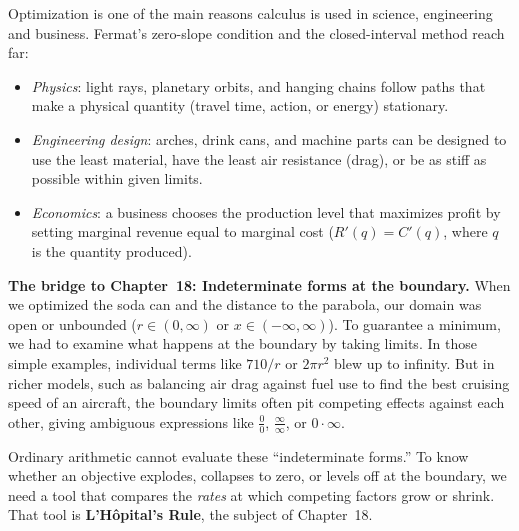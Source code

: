 \begin{connectionbox}
Optimization is one of the main reasons calculus is used in science, engineering and
business. Fermat's zero-slope condition and the closed-interval method reach far:
\begin{itemize}
  \item \emph{Physics}: light rays, planetary orbits, and
    hanging chains follow paths that make a physical quantity (travel time,
    action, or energy) stationary.
  \item \emph{Engineering design}: arches, drink cans, and
    machine parts can be designed to use the least material, have the least air
    resistance (drag), or be as stiff as possible within given limits.
  \item \emph{Economics}: a business chooses the production level that
    maximizes profit by setting marginal revenue equal to marginal cost
    ($R'(q) = C'(q)$, where $q$ is the quantity produced).
\end{itemize}

\textbf{The bridge to Chapter~18: Indeterminate forms at the boundary.}
When we optimized the soda can and the distance to the parabola, our domain was open or
unbounded ($r \in (0,\infty)$ or $x \in (-\infty,\infty)$). To guarantee a minimum, we
had to examine what happens at the boundary by taking limits. In those simple examples,
individual terms like $710/r$ or $2\pi r^2$ blew up to infinity. But in richer
models, such as balancing air drag against fuel use to find the best cruising speed
of an aircraft, the boundary limits often pit competing
effects against each other, giving ambiguous expressions like $\tfrac{0}{0}$,
$\tfrac{\infty}{\infty}$, or $0 \cdot \infty$.

Ordinary arithmetic cannot evaluate these ``indeterminate forms.'' To know whether an
objective explodes, collapses to zero, or levels off at the boundary, we
need a tool that compares the \emph{rates} at which competing factors grow or
shrink. That tool is \textbf{L'H\^opital's Rule}, the subject of Chapter~18.


\end{connectionbox}
